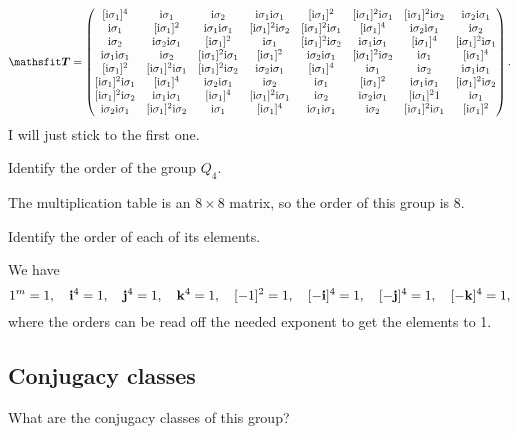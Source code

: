 \documentclass[11pt, english, fleqn, DIV=15, headinclude, BCOR=1cm]{scrartcl}
\begin{document}
\[
    \tens T =
    \begin{pmatrix}
         [\iup\1]^4   &  \iup\1 &  \iup\2 &  \iup\1\iup\1 & [\iup\1]^2   & [\iup\1]^2\iup\1 & [\iup\1]^2\iup\2 & \iup\2\iup\1 \\
         \iup\1 & [\iup\1]^2   &  \iup\1\iup\1 & [\iup\1]^2\iup\2 & [\iup\1]^2\iup\1 &  [\iup\1]^4   & \iup\2\iup\1 &  \iup\2 \\
         \iup\2 & \iup\2\iup\1 & [\iup\1]^2   &  \iup\1 & [\iup\1]^2\iup\2 &  \iup\1\iup\1 &  [\iup\1]^4   & [\iup\1]^2\iup\1 \\
         \iup\1\iup\1 &  \iup\2 & [\iup\1]^2\iup\1 & [\iup\1]^2   & \iup\2\iup\1 & [\iup\1]^2\iup\2 &  \iup\1 &  [\iup\1]^4   \\
        [\iup\1]^2   & [\iup\1]^2\iup\1 & [\iup\1]^2\iup\2 & \iup\2\iup\1 &  [\iup\1]^4   &  \iup\1 &  \iup\2 &  \iup\1\iup\1 \\
        [\iup\1]^2\iup\1 &  [\iup\1]^4   & \iup\2\iup\1 &  \iup\2 &  \iup\1 & [\iup\1]^2   &  \iup\1\iup\1 & [\iup\1]^2\iup\2 \\
        [\iup\1]^2\iup\2 &  \iup\1\iup\1 &  [\iup\1]^4   & [\iup\1]^2\iup\1 &  \iup\2 & \iup\2\iup\1 & [\iup\1]^21   &  \iup\1 \\
        \iup\2\iup\1 & [\iup\1]^2\iup\2 &  \iup\1 &  [\iup\1]^4   &  \iup\1\iup\1 &  \iup\2 & [\iup\1]^2\iup\1 & [\iup\1]^2  
    \end{pmatrix}.
\]
I will just stick to the first one.

\begin{problem}
    Identify the order of the group $Q_4$.
\end{problem}

The multiplication table is an $8 \times 8$ matrix, so the order of this group
is 8.

\begin{problem}
    Identify the order of each of its elements.
\end{problem}

We have
\[
    1^m = 1
    ,\quad \mathbf i^4 = 1
    ,\quad \mathbf j^4 = 1
    ,\quad \mathbf k^4 = 1
    ,\quad [-1]^2 = 1
    ,\quad [-\mathbf i]^4 = 1
    ,\quad [-\mathbf j]^4 = 1
    ,\quad [-\mathbf k]^4 = 1,
\]
where the orders can be read off the needed exponent to get the elements to 1.

\subsection{Conjugacy classes}

\begin{problem}
    What are the conjugacy classes of this group?
\end{problem}
\end{document}

